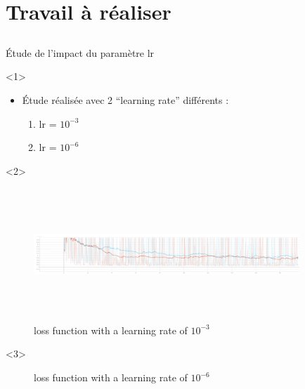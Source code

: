 \documentclass{beamer}
\begin{document}
\section{Travail à réaliser}

\subsection*{}

\begin{frame}[t]{\'Etude de l'impact du paramètre lr}
  \begin{onlyenv}<1>
    \begin{itemize}
      \item[] \'Etude réalisée avec 2 ``learning rate'' différents :
      \begin{enumerate}
        \item lr = $10^{-3}$
        \item lr = $10^{-6}$
      \end{enumerate}
    \end{itemize}
  \end{onlyenv}
  \begin{onlyenv}<2>
    \begin{figure}
      \begin{center}
        \includegraphics[width=10cm, height=5cm]{annex/loss_smoothed_099}
        \caption{loss function with a learning rate of $10^{-3}$}
        \label{1e3}
      \end{center}
    \end{figure}
  \end{onlyenv}
  \begin{onlyenv}<3>
    \begin{figure}
      \begin{center}
        \caption{loss function with a learning rate of $10^{-6}$}
        \label{1e6}
      \end{center}
    \end{figure}
  \end{onlyenv}
\end{frame}
\end{document}
